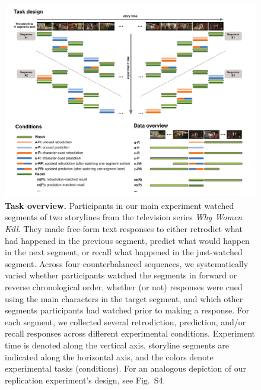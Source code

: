 \documentclass[10pt]{article}
\newcommand{\MethodsReplExp}{S4}
\begin{document}
\begin{figure}[tp]
  \centering
  \includegraphics[width=\textwidth]{methods}

  \caption{\textbf{Task overview.} Participants in our main experiment watched
  segments of two storylines from the television series \textit{Why Women
  Kill}. They made free-form text responses to either retrodict what had
  happened in the previous segment, predict what would happen in the next
  segment, or recall what happened in the just-watched segment. Across four
  counterbalanced sequences, we systematically varied whether participants
  watched the segments in forward or reverse chronological order, whether (or
  not) responses were cued using the main characters in the target segment, and
  which other segments participants had watched prior to making a response. For
  each segment, we collected several retrodiction, prediction, and/or recall
  responses across different experimental conditions. Experiment time is
  denoted along the vertical axis, storyline segments are indicated along the
  horizontal axis, and the colors denote experimental tasks (conditions). For
  an analogous depiction of our replication experiment's design, see
  Fig.~\MethodsReplExp.}

  \label{fig:method}
\end{figure}
\end{document}
